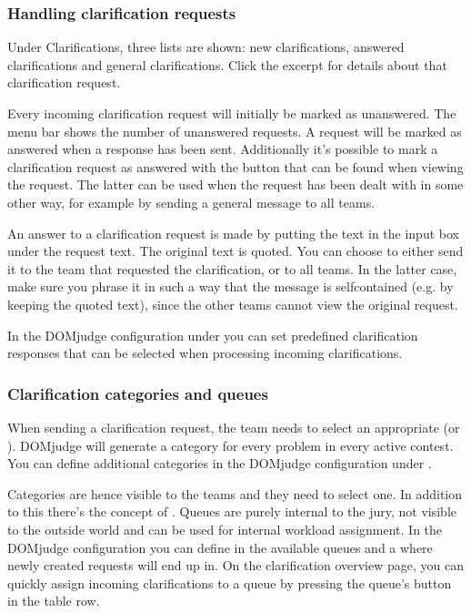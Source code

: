 \documentclass[a4paper,10pt,english,openany]{sphinxmanual}
\begin{document}
\subsubsection{Handling clarification requests}
\label{\detokenize{running:handling-clarification-requests}}
\sphinxAtStartPar
Under Clarifications, three lists are shown: new clarifications,
answered clarifications and general clarifications. Click the excerpt
for details about that clarification request.

\sphinxAtStartPar
Every incoming clarification request will initially be marked as
unanswered. The menu bar shows the number of unanswered requests. A
request will be marked as answered when a response has been sent.
Additionally it’s possible to mark a clarification request as answered
with the button that can be found when viewing the request. The latter
can be used when the request has been dealt with in some other way,
for example by sending a general message to all teams.

\sphinxAtStartPar
An answer to a clarification request is made by putting the text in the
input box under the request text. The original text is quoted. You can
choose to either send it to the team that requested the clarification,
or to all teams. In the latter case, make sure you phrase it in such a
way that the message is self\sphinxhyphen{}contained (e.g. by keeping the quoted
text), since the other teams cannot view the original request.

\sphinxAtStartPar
In the DOMjudge configuration under  you can set predefined
clarification responses that can be selected when processing incoming
clarifications.


\subsubsection{Clarification categories and queues}
\label{\detokenize{running:clarification-categories-and-queues}}
\sphinxAtStartPar
When sending a clarification request, the team needs to select an
appropriate  (or ). DOMjudge will generate a category
for every problem in every active contest. You can define additional
categories in the DOMjudge configuration under .

\sphinxAtStartPar
Categories are hence visible to the teams and they need to select one.
In addition to this there’s the concept of . Queues are purely
internal to the jury, not visible to the outside world and can be used
for internal workload assignment. In the DOMjudge configuration you can
define in  the available queues and a
 where newly created requests will end up in.
On the clarification overview page, you can quickly assign incoming
clarifications to a queue by pressing the queue’s button in the table row.
\end{document}
